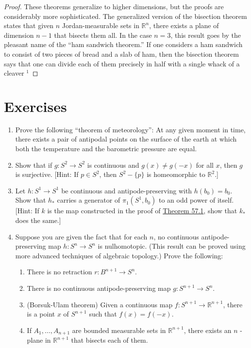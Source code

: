 \begin{proof}
These theorems generalize to higher dimensions, but the proofs are considerably more sophisticated. The generalized version of the bisection theorem states that given \(n\) Jordan-measurable sets in \(\mathbb{R}^{n}\), there exists a plane of dimension \(n - 1\) that bisects them all. In the case \(n = 3\), this result goes by the pleasant name of the ``ham sandwich theorem.'' If one considers a ham sandwich to consist of two pieces of bread and a slab of ham, then the bisection theorem says that one can divide each of them precisely in half with a single whack of a cleaver \({}^{1}\)
\end{proof}
\section*{Exercises}
\begin{enumerate}[itemsep=0.4em, parsep=0pt, topsep=0pt, partopsep=0pt, leftmargin=*, label=\arabic*., ref=\arabic*]
\item Prove the following ``theorem of meteorology'': At any given moment in time, there exists a pair of antipodal points on the surface of the earth at which both the temperature and the barometric pressure are equal.
\item Show that if \(g : S^{2} \rightarrow {S}^{2}\) is continuous and \(g(x) \neq g( {-x})\) for all \(x\), then \(g\) is surjective. [Hint: If \(p \in {S}^{2}\), then \(S^{2} - \{ p\}\) is homeomorphic to \(\mathbb{R}^{2}\).]
\item Let \(h : S^{1} \rightarrow {S}^{1}\) be continuous and antipode-preserving with \(h( b_{0}) = b_{0}\). Show that \(h_{ * }\) carries a generator of \({\pi }_{1}( {S^{1},b_{0}})\) to an odd power of itself. [Hint: If \(k\) is the map constructed in the proof of \hyperref[thm:57.1]{Theorem 57.1}, show that \(k_{ * }\) does the same.]
\item Suppose you are given the fact that for each \(n\), no continuous antipode-preserving map \(h : S^{n} \rightarrow {S}^{n}\) is nulhomotopic. (This result can be proved using more advanced techniques of algebraic topology.) Prove the following:
 \begin{enumerate}[itemsep=0.2em, parsep=0pt, topsep=0pt, partopsep=0pt, leftmargin=*, label=(\alph*), align=left]
 \item There is no retraction \(r : B^{n + 1} \rightarrow {S}^{n}\).
 \item There is no continuous antipode-preserving map \(g : S^{n + 1} \rightarrow {S}^{n}\).
 \item (Borsuk-Ulam theorem) Given a continuous map \(f : S^{n + 1} \rightarrow {\mathbb{R}}^{n + 1}\), there is a point \(x\) of \(S^{n + 1}\) such that \(f(x) = f( {-x})\).
 \item If \(A_{1},\ldots ,A_{n + 1}\) are bounded measurable sets in \(\mathbb{R}^{n + 1}\), there exists an \(n\) - plane in \(\mathbb{R}^{n + 1}\) that bisects each of them.
 \end{enumerate}
\end{enumerate}

